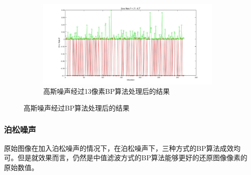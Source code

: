 \documentclass{article}
\newcounter{sub}
\begin{document}
\begin{figure}[htpb]
\begin{subfigure}[htpb]{.45\linewidth}
	\end{subfigure}
	\quad
	\begin{subfigure}[htpb]{.45\linewidth}
		\centering
		\includegraphics[width=\linewidth]{Gauss-13.png}
		\caption{高斯噪声经过13像素BP算法处理后的结果}
		\label{fig:高斯噪声经过13像素BP算法处理后的结果}
	\end{subfigure}
	\caption{高斯噪声经过BP算法处理后的结果}
	\label{fig:高斯噪声经过BP算法处理后的结果}
\end{figure}

\subsubsection{泊松噪声}%
\label{ssub:泊松噪声}

原始图像在加入泊松噪声的情况下，在泊松噪声下，三种方式的BP算法成效均可。但是就效果而言，仍然是中值滤波方式的BP算法能够更好的还原图像像素的原始数值。
\end{document}
